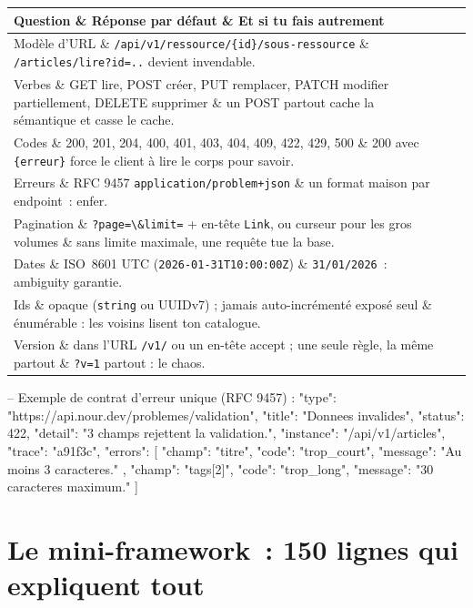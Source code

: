 \documentclass[12pt,a4paper,twoside,openright]{book}
\makeatletter
\newenvironment{tabz}[1]{\rowcolors{2}{white}{tralight}%
  \small\setlength{\tabcolsep}{5pt}\setlength{\LTpre}{3pt}\setlength{\LTpost}{3pt}%
  \begin{longtable}{@{}#1@{}}\toprule}
  {\bottomrule\end{longtable}\normalfont\setlength{\tabcolsep}{6pt}}
\newcommand{\thd}[1]{\textbf{\color{white}#1}}
\newcommand{\headrow}{\rowcolor{theadbg}}
\makeatother
\begin{document}
\begin{tabz}{lXX}
  \headrow \thd{Question} \& \thd{R\'eponse par d\'efaut} \& \thd{Et si tu fais autrement} \\
  \midrule
  Mod\`ele d'URL \& \verb|/api/v1/ressource/{id}/sous-ressource| \& \verb|/articles/lire?id=..| devient invendable. \\
  Verbes \& GET lire, POST cr\'eer, PUT remplacer, PATCH modifier partiellement, DELETE supprimer \& un POST partout cache la s\'emantique et casse le cache. \\
  Codes \& 200, 201, 204, 400, 401, 403, 404, 409, 422, 429, 500 \& 200 avec \verb|{erreur}| force le client \`a lire le corps pour savoir. \\
  Erreurs \& RFC 9457 \verb|application/problem+json| \& un format maison par endpoint~: enfer. \\
  Pagination \& \verb|?page=\&limit=| + en-t\^ete \verb|Link|, ou curseur pour les gros volumes \& sans limite maximale, une requ\^ete tue la base. \\
  Dates \& ISO~8601 UTC (\verb|2026-01-31T10:00:00Z|) \& \verb|31/01/2026|~: ambiguity garantie. \\
  Ids \& opaque (\verb|string| ou UUIDv7) ; jamais auto-incr\'ement\'e expos\'e seul \& \'enum\'erable : les voisins lisent ton catalogue. \\
  Version \& dans l'URL \verb|/v1/| ou un en-t\^ete accept ; une seule r\`egle, la m\^eme partout \& \verb|?v=1| partout : le chaos. \\
\end{tabz}

\begin{codesql}
-- Exemple de contrat d'erreur unique (RFC 9457) :
{
  "type": "https://api.nour.dev/problemes/validation",
  "title": "Donnees invalides",
  "status": 422,
  "detail": "3 champs rejettent la validation.",
  "instance": "/api/v1/articles",
  "trace": "a91f3c",
  "errors": [
    { "champ": "titre", "code": "trop_court", "message": "Au moins 3 caracteres." },
    { "champ": "tags[2]", "code": "trop_long", "message": "30 caracteres maximum." }
  ]
}
\end{codesql}

\section{Le mini-framework~: 150 lignes qui expliquent tout}
\end{document}
